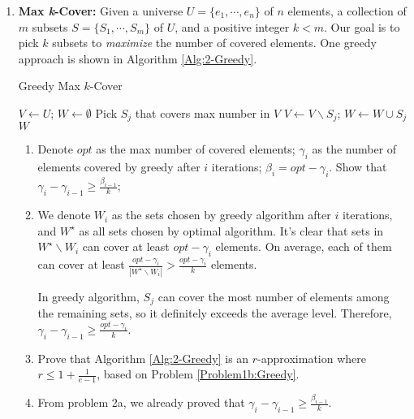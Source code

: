 \documentclass[12pt,a4paper]{article}
\makeatletter
\newtheorem*{solution}{Solution}
\theoremstyle{definition}
\renewenvironment{solution}[1][Solution] {\par\pushQED{\qed}\normalfont\topsep6\p@\@plus6\p@\relax\trivlist\item[\hskip\labelsep\bfseries#1\@addpunct{.}]\ignorespaces}{\popQED\endtrivlist\@endpefalse} \makeatother
\makeatother
\begin{document}
\begin{enumerate}
\item \textbf{Max \emph{k}-Cover:} Given a universe $U=\{e_1,\cdots,e_n\}$ of $n$ elements, a collection of $m$ subsets $S=\{S_1,\cdots,S_m\}$ of $U$, and a positive integer $k<m$. Our goal is to pick $k$ subsets to \emph{maximize} the number of covered elements. One greedy approach is shown in Algorithm \ref{Alg:2-Greedy}.

\begin{center}
\begin{minipage}{0.7\textwidth}
\begin{algorithm}[H]
	\caption{Greedy Max $k$-Cover}\label{Alg:2-Greedy}
	\LinesNumbered
	$V \leftarrow U$; $W \leftarrow \emptyset$\;
	{
		Pick $S_j$ that covers max number in $V$\;
		$V\leftarrow V\backslash S_j$; $W\leftarrow W\cup S_j$\;
	}
	\Return $W$\;
\end{algorithm}
\end{minipage}
\end{center}

\begin{enumerate}
\item \label{Problem1b:Greedy}Denote $opt$ as the max number of covered elements; $\gamma_i$ as the number of elements covered by greedy after $i$ iterations; $\beta_i=opt-\gamma_i$. Show that $\gamma_i-\gamma_{i-1}\geq \frac{\beta_{i-1}}{k}$;

\begin{solution}
   	We denote $W_i$ as the sets chosen by greedy algorithm after $i$ iterations, and $W^\star$ as all sets chosen by optimal algorithm. It's clear that sets in $W^\star\backslash W_i$ can cover at least $opt-\gamma_i$ elements. On average, each of them can cover at least $\frac{opt-\gamma_i}{| W^\star\backslash W_i|} > \frac{opt-\gamma_i}{k}$ elements.
   	
   	In greedy algorithm, $S_j$ can cover the most number of elements among the remaining sets, so it definitely exceeds the average level. Therefore, $\gamma_i-\gamma_{i-1} \geq \frac{opt-\gamma_i}{k}$. 
\end{solution}

\item Prove that Algorithm \ref{Alg:2-Greedy} is an $r$-approximation where $r\leq 1+\frac{1}{e-1}$, based on Problem \ref{Problem1b:Greedy}.

\begin{solution}
   	From problem 2a, we already proved that $\gamma_i-\gamma_{i-1}\geq \frac{\beta_{i-1}}{k}$. 
   	

\end{solution}
\end{enumerate}
\end{enumerate}
\end{document}
